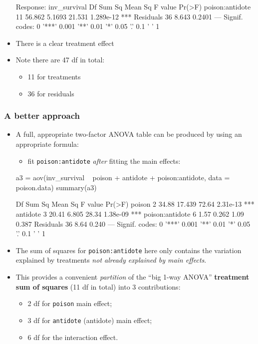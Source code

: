 \documentclass[a4paper]{article}\usepackage[]{graphicx}\usepackage[]{xcolor}
\begin{document}
\begin{itemize}
\begin{Schunk}
\begin{Soutput}
Response: inv_survival
                Df Sum Sq Mean Sq F value    Pr(>F)    
poison:antidote 11 56.862  5.1693  21.531 1.289e-12 ***
Residuals       36  8.643  0.2401                      
---
Signif. codes:  0 '***' 0.001 '**' 0.01 '*' 0.05 '.' 0.1 ' ' 1
\end{Soutput}
\end{Schunk}
	\item There is a clear treatment effect
	\item Note there are 47 df in total:
	\begin{itemize}
		\item 11 for treatments
		\item 36 for residuals
	\end{itemize}
\end{itemize}
\subsubsection{A better approach}
\begin{itemize}
	\item A full, appropriate two-factor ANOVA table can be produced by using an appropriate formula:
	\begin{itemize}
		\item fit \lstinline|poison:antidote| \textit{after}  fitting the main effects:
	\end{itemize}
\begin{Schunk}
\begin{Sinput}
a3 = aov(inv_survival ~ poison + antidote + poison:antidote, 
         data = poison.data)
summary(a3)
\end{Sinput}
\begin{Soutput}
                Df Sum Sq Mean Sq F value   Pr(>F)    
poison           2  34.88  17.439   72.64 2.31e-13 ***
antidote         3  20.41   6.805   28.34 1.38e-09 ***
poison:antidote  6   1.57   0.262    1.09    0.387    
Residuals       36   8.64   0.240                     
---
Signif. codes:  0 '***' 0.001 '**' 0.01 '*' 0.05 '.' 0.1 ' ' 1
\end{Soutput}
\end{Schunk}
	\item The sum of squares for \lstinline|poison:antidote| here only contains the variation explained by treatments \textit{not already explained by main effects}.
	\item This provides a convenient \textit{partition} of the ``big 1-way ANOVA'' \textbf{treatment sum of squares} (11 df in total) into 3 contributions:
	\begin{itemize}
		\item 2 df for \lstinline|poison| main effect;
		\item 3 df for \lstinline|antidote| (antidote) main effect;
		\item 6 df for the interaction effect.
	\end{itemize}
\end{itemize}
\end{document}
